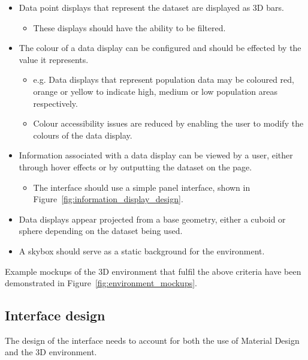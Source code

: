 {{		\begin{itemize}
			\item Data point displays that represent the dataset are displayed as 3D bars.
				\begin{itemize}
					\item These displays should have the ability to be filtered.
				\end{itemize}
			\item The colour of a data display can be configured and should be effected by the value it represents.
				\begin{itemize}
					\item e.g. Data displays that represent population data may be coloured red, orange or yellow to indicate high, medium or low population areas respectively.
					\item Colour accessibility issues are reduced by enabling the user to modify the colours of the data display.
				\end{itemize}
			\item Information associated with a data display can be viewed by a user, either through hover effects or by outputting the dataset on the page.
				\begin{itemize}
					\item The interface should use a simple panel interface, shown in Figure~\ref{fig:information_display_design}.
				\end{itemize}
			\item Data displays appear projected from a base geometry, either a cuboid or sphere depending on the dataset being used.
			\item A skybox should serve as a static background for the environment.
		\end{itemize}

		

		Example mockups of the 3D environment that fulfil the above criteria have been demonstrated in Figure~\ref{fig:environment_mockups}.

		

	}

	\subsection{Interface design} {
	\label{sec:interface_design}

		The design of the interface needs to account for both the use of Material Design and the 3D environment. 

}}

